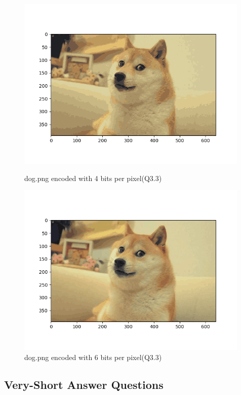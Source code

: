 \documentclass{article}
\begin{document}
\begin{figure}
    \includegraphics[width=30em]{a2_q3_2_3.png}
    \caption{dog.png encoded with 4 bits per pixel(Q3.3)}
    \label{fig:q3_2_3}

    \includegraphics[width=30em]{a2_q3_2_4.png}
    \caption{dog.png encoded with 6 bits per pixel(Q3.3)}
    \label{fig:q3_2_4}
 \end{figure}
\subsection{Very-Short Answer Questions}
\end{document}
